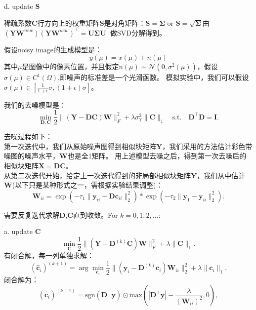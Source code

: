 \documentclass[10pt,twocolumn,letterpaper]{article}
\begin{document}
d. update $\mathbf{S}$

稀疏系数$\mathbf{C}$行方向上的权重矩阵$\mathbf{S}$是对角矩阵：$\mathbf{S}=\mathbf{\Sigma}$ or $\mathbf{S}=\sqrt{\mathbf{\Sigma}}$由$(\mathbf{Y}\mathbf{W}^{new})(\mathbf{Y}\mathbf{W}^{new})^{\top}=\mathbf{U}\mathbf{\Sigma}\mathbf{U}^{\top}$做SVD分解得到。




\clearpage

假设noisy image的生成模型是：
\begin{equation}
y(\mu)=x(\mu) + n(\mu)
\end{equation}
其中$\mu$是图像中的像素位置，并且假定$n(\mu)\sim \mathcal{N}(0,\sigma^{2}({\mu}))$，假设$\sigma({\mu})\in C^{1}(\Omega)$,即噪声的标准差是一个光滑函数。
模拟实验中，我们可以假设$\sigma({\mu})\in [\frac{1}{1+\epsilon}\sigma, (1+\epsilon)\sigma]$。

我们的去噪模型是：
\begin{equation}
\min_{\mathbf{D},\mathbf{C}}\frac{1}{2}\|(\mathbf{Y}-\mathbf{D}\mathbf{C})\mathbf{W}\|_{F}^{2}
+
\lambda\sigma_{Y}^{2}\|\mathbf{C}\|_{1}
\quad
\text{s.t.}
\quad
\mathbf{D}^{\top}\mathbf{D} =\mathbf{I}. 
\end{equation}

去噪过程如下：
\\
第一次迭代中，我们从原始噪声图得到相似块矩阵$\mathbf{Y}$，我们采用\cite{Chen2015ICCV}的方法估计彩色带噪图的噪声水平，$\mathbf{W}$也是全1矩阵。
用上述模型去噪之后，得到第一次去噪后的相似块矩阵$\mathbf{X}=\mathbf{DC}$。
\\
从第二次迭代开始，给定上一次迭代得到的非局部相似块矩阵$\mathbf{Y}$，我们从中估计$\mathbf{W}$(以下只是某种形式之一，需根据实验结果调整)：
\begin{equation}
\mathbf{W}_{ii} 
=
\exp(-\tau_{1}\|\mathbf{y}_{ii}-\mathbf{D}\mathbf{c}_{ii}\|_{2}^{2})
*\exp(-\tau_{2}\|\mathbf{y}_{1}-\mathbf{y}_{ii}\|_{2}^{2}).
\end{equation}

需要反复迭代求解$\mathbf{D}$,$\mathbf{C}$直到收敛。For $k=0,1,2,...$:

a. update $\mathbf{C}$
\begin{equation}
\min_{\mathbf{C}}\frac{1}{2}\|(\mathbf{Y}-\mathbf{D}^{(k)}\mathbf{C})\mathbf{W}\|_{F}^{2}
+
\lambda\|\mathbf{C}\|_{1}.
\end{equation}
有闭合解，每一列单独求解：
\begin{equation}
(\hat{\mathbf{c}}_{i})^{(k+1)}
=
\arg\min_{\mathbf{c}_{i}}\frac{1}{2}\|(\mathbf{y}_{i}-\mathbf{D}^{(k)}\mathbf{c}_{i})\mathbf{W}_{ii}\|_{2}^{2}
+
\lambda\|\mathbf{c}_{i}\|_{1}.
\end{equation}
闭合解为：
\begin{equation}
(\hat{\mathbf{c}}_{i})^{(k+1)}
=
\text{sgn}(\mathbf{D^{\top}y}) 
\odot 
\text{max}(|\mathbf{D^{\top}y}|-\frac{\lambda}{(\mathbf{W}_{ii})^{2}},0),
\end{equation}
\end{document}
